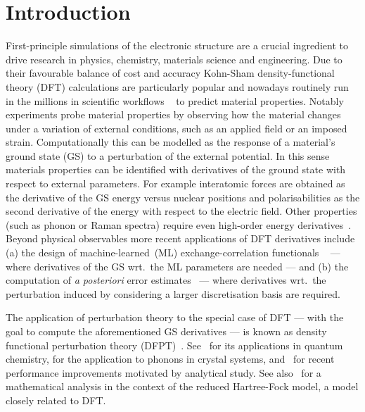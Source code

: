 \documentclass[hidelinks,onefignum,onetabnum]{siamart250211}
\begin{document}
\section{Introduction}
First-principle simulations of the electronic structure are a crucial
ingredient to drive research in physics, chemistry, materials science and engineering.
Due to their favourable balance of cost and accuracy
Kohn-Sham density-functional theory (DFT) calculations
are particularly popular
and nowadays routinely run in the millions in scientific workflows%
~\cite{%
kirklin2015open,Chanussot2021}
to predict material properties. %
%
%
%
%
%
%
%
%
%
%
%
%
%
%
Notably experiments probe material properties by observing
how the material changes under a variation of external conditions,
such as an applied field or an imposed strain.
Computationally this can be modelled as the response of a material's ground state (GS)
to a perturbation of the external potential.
In this sense materials properties can be identified
with derivatives of the ground state
with respect to external parameters.
%
%
%
%
%
%
%
%
For example interatomic forces are obtained as the derivative of the GS energy versus nuclear positions
and polarisabilities as the second derivative of the energy with respect to the electric field.
Other properties (such as phonon or Raman spectra) require
even high-order energy derivatives~\cite{baroni2001phonons,rivano2024density,windl1993second}. %
Beyond physical observables more recent applications of DFT derivatives
include (a) the design of machine-learned~(ML) exchange-correlation functionals%
~\cite{%
Kirkpatrick2021,Kasim2021,Chen2021,Wu2023xcml}
--- where derivatives of the GS wrt.~the ML parameters are needed ---
and (b) the computation of \textit{a posteriori} error estimates~\cite{herbst2020posteriori,dusson2017posteriori}
--- where derivatives wrt.~the perturbation induced by considering a larger discretisation basis
are required.

The application of perturbation theory to the special case of DFT
--- with the goal to compute the aforementioned GS derivatives ---
is known as density functional perturbation theory (DFPT)~\cite{baroniGreenSfunctionApproach1987,
gonzeDensityfunctionalApproachNonlinearresponse1989,gonze1995adiabatic,Gonze1995}.
See~\cite{normanPrinciplesPracticesMolecular2018} for its applications in quantum chemistry,
\cite{baroni2001phonons} for the application to phonons in crystal systems,
%
and~\cite{Lin2017,cances2023numerical} for recent performance improvements
motivated by analytical study.
See also~\cite{cancesMathematicalPerspectiveDensity2014} for a mathematical analysis in the context
of the reduced Hartree-Fock model, a model closely related to DFT.
\end{document}
